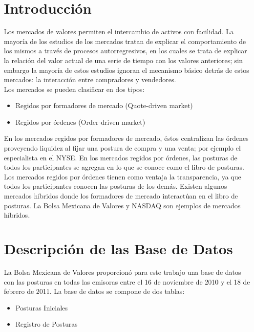 \documentclass[10pt]{article}
\begin{document}
\thispagestyle{empty}
\tableofcontents
\clearpage

\setcounter{page}{1}

\section{Introducción}

Los mercados de valores permiten el intercambio de activos con facilidad. La mayoría de los estudios de los mercados tratan de explicar el comportamiento de los mismos a través de procesos autorregresivos, en los cuales se trata de explicar la relación del valor actual de una serie de tiempo con los valores anteriores; sin embargo la mayoría de estos estudios ignoran el mecanismo básico detrás de estos mercados: la interacción entre compradores y vendedores.\\

Los mercados se pueden clasificar en dos tipos:
\begin{itemize}
  \item Regidos por formadores de mercado (Quote-driven market)
  \item Regidos por órdenes (Order-driven market)
\end{itemize}

En los mercados regidos por formadores de mercado, éstos centralizan las órdenes proveyendo liquidez al fijar una postura de compra y una venta; por ejemplo el especialista en el NYSE. En los mercados regidos por órdenes, las posturas de todos los participantes se agregan en lo que se conoce como el libro de posturas. Los mercados regidos por órdenes tienen como ventaja la transparencia, ya que todos los participantes conocen las posturas de los demás. Existen algunos mercados híbridos donde los formadores de mercado interactúan en el libro de posturas. La Bolsa Mexicana de Valores y NASDAQ son ejemplos de mercados híbridos.

\clearpage

\section{Descripción de las Base de Datos}
La Bolsa Mexicana de Valores proporcionó para este trabajo una base de datos con las posturas en todas las emisoras entre el 16 de noviembre de 2010 y el 18 de febrero de 2011. La base de datos se compone de dos tablas:

\begin{itemize}
  \item Posturas Iniciales
  \item Registro de Posturas
\end{itemize}
\end{document}
